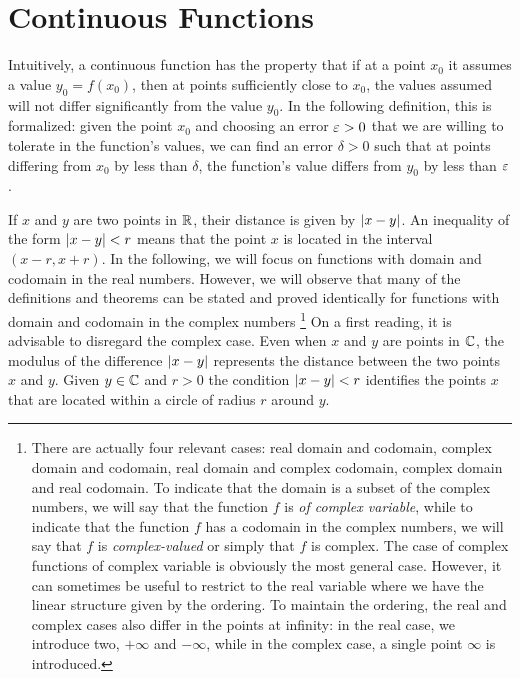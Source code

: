 \section{Continuous Functions}
\label{sec:continuita}

Intuitively, a continuous function has the property that if at a point $x_0$ it
assumes a value $y_0=f(x_0)$, then at points sufficiently close to $x_0$, the
values assumed will not differ significantly from the value $y_0$. In the
following definition, this is formalized: given the point $x_0$ and choosing an
error $\varepsilon>0$ that we are willing to tolerate in the function's values, we can
find an error $\delta>0$ such that at points differing from $x_0$ by less than
$\delta$, the function's value differs from $y_0$ by less than $\varepsilon$.

If $x$ and $y$ are two points in ${\mathbb R}$, their distance is given by ${\left|x-y\right|}$.
An inequality of the form ${\left|x-y\right|}<r$ means that the point $x$ is located in
the interval $(x-r,x+r)$. In the following, we will focus on functions with
domain and codomain in the real numbers. However, we will observe that many of
the definitions and theorems can be stated and proved identically for functions
with domain and codomain in the complex numbers%
\footnote{There are actually four relevant cases: real domain and codomain, complex domain and codomain, real domain and complex codomain, complex domain and real codomain. To indicate that the domain is a subset of the complex numbers, we will say that the function $f$ is \emph{of complex variable}, while to indicate that the function $f$ has a codomain in the complex numbers, we will say that $f$ is \emph{complex-valued} or simply that $f$ is complex. The case of complex functions of complex variable is obviously the most general case. However, it can sometimes be useful to restrict to the real variable where we have the linear structure given by the ordering. To maintain the ordering, the real and complex cases also differ in the points at infinity: in the real case, we introduce two, $+\infty$ and $-\infty$, while in the complex case, a single point $\infty$ is introduced.}
On a first reading, it is advisable to disregard the complex case. Even when $x$
and $y$ are points in ${\mathbb C}$, the modulus of the difference ${\left|x-y\right|}$
represents the distance between the two points $x$ and $y$. Given $y\in {\mathbb C}$ and
$r>0$
the condition ${\left|x-y\right|}<r$ identifies the points $x$ that are located within a
circle of radius $r$ around $y$.

